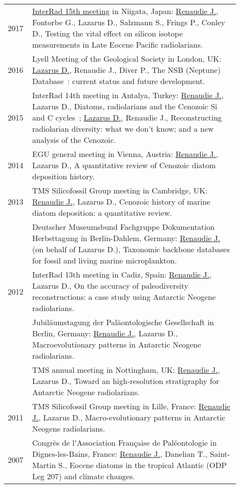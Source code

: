 \documentclass[11pt, a4paper]{article}
\begin{document}
\begin{longtable}{@{}p{0.1\linewidth} P{0.85\linewidth}@{}}
2017 & \href{http://interrad2017.random-walk.org/wp-content/uploads/2017/10/Abstracts_InterRadXV_171016b.pdf}{InterRad 15th meeting} in Niigata, Japan: \underline{Renaudie J.}, Fontorbe G., Lazarus D., Salzmann S., Frings P., Conley D., Testing the vital effect on silicon isotope measurements in Late Eocene Pacific radiolarians.\\
2016 & Lyell Meeting of the Geological Society in London, UK: \underline{Lazarus D.}, Renaudie J., Diver P., The NSB (Neptune) Database : current status and future development.\\
2015 & InterRad 14th meeting in Antalya, Turkey: \underline{Renaudie J.}, Lazarus D., Diatoms, radiolarians and the Cenozoic Si and C cycles ; \underline{Lazarus D.}, Renaudie J., Reconstructing radiolarian diversity: what we don't know; and a new analysis of the Cenozoic.\\
2014 & EGU general meeting in Vienna, Austria: \underline{Renaudie J.}, Lazarus D., A quantitative review of Cenozoic diatom deposition history.\\
2013 & TMS Silicofossil Group meeting in Cambridge, UK: \underline{Renaudie J.}, Lazarus D., Cenozoic history of marine diatom deposition: a quantitative review.\\
 & Deutscher Museumsbund Fachgruppe Dokumentation Herbsttagung in Berlin-Dahlem, Germany: \underline{Renaudie J.} (on behalf of Lazarus D.), Taxonomic backbone databases for fossil and living marine microplankton.\\
2012 & InterRad 13th meeting in Cadiz, Spain: \underline{Renaudie J.}, Lazarus D., On the accuracy of paleodiversity reconstructions: a case study using Antarctic Neogene radiolarians.\\
 & Jubil\"{a}umstagung der Pal\"{a}ontologische Gesellschaft in Berlin, Germany: \underline{Renaudie J.}, Lazarus D., Macroevolutionary patterns in Antarctic Neogene radiolarians.\\
 & TMS annual meeting in Nottingham, UK: \underline{Renaudie J.}, Lazarus D., Toward an high-resolution stratigraphy for Antarctic Neogene radiolarians.\\
2011 & TMS Silicofossil Group meeting in Lille, France: \underline{Renaudie J.}, Lazarus D., Macro-evolutionary patterns in Antarctic Neogene radiolarians.\\
2007 & Congr\`{e}s de l'Association Fran\c{c}aise de Pal\'{e}ontologie in Dignes-les-Bains, France: \underline{Renaudie J.}, Danelian T., Saint-Martin S., Eocene diatoms in the tropical Atlantic (ODP Leg 207) and climate changes.\\
\end{longtable}
\end{document}
